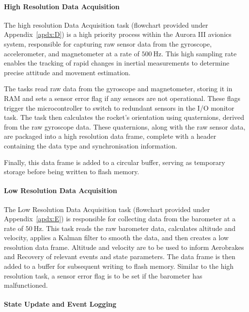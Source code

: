 \paragraph{High Resolution Data Acquisition}

The high resolution Data Acquisition task (flowchart provided under Appendix~\ref{apdx:D}) is a high priority process within the Aurora III avionics system, responsible for capturing raw sensor data from the gyroscope, accelerometer, and magnetometer at a rate of $\SI{500}{\hertz}$. This high sampling rate enables the tracking of rapid changes in inertial measurements to determine precise attitude and movement estimation. 

The tasks read raw data from the gyroscope and magnetometer, storing it in RAM and sets a sensor error flag if any sensors are not operational. These flags trigger the microcontroller to switch to redundant sensors in the I/O monitor task. The task then calculates the rocket's orientation using quaternions, derived from the raw gyroscope data. These quaternions, along with the raw sensor data, are packaged into a high resolution data frame, complete with a header containing the data type and synchronisation information. 

Finally, this data frame is added to a circular buffer, serving as temporary storage before being written to flash memory.  
 
\paragraph{Low Resolution Data Acquisition}

The Low Resolution Data Acquisition task (flowchart provided under Appendix~\ref{apdx:E}) is responsible for collecting data from the barometer at a rate of $\SI{50}{\hertz}$. This task reads the raw barometer data, calculates altitude and velocity, applies a Kalman filter to smooth the data, and then creates a low resolution data frame. Altitude and velocity are to be used to inform Aerobrakes and Recovery of relevant events and state parameters. The data frame is then added to a buffer for subsequent writing to flash memory. Similar to the high resolution task, a sensor error flag is to be set if the barometer has malfunctioned.  

\paragraph{State Update and Event Logging}


